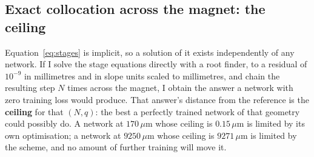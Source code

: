 \documentclass[11pt,a4paper]{article}
\newcommand{\um}{\ensuremath{\,\mu\mathrm{m}}}
\begin{document}
\subsection{Exact collocation across the magnet: the ceiling}
\label{sec:scheme-ceiling}

Equation~\eqref{eq:stages} is implicit, so a solution of it exists independently of
any network. If I solve the stage equations directly with a root finder, to a
residual of $10^{-9}$ in millimetres and in slope units scaled to millimetres,
and chain the resulting step $N$ times across the magnet, I obtain the answer a
network with zero training loss would produce. That answer's distance from the
reference is the \textbf{ceiling} for that $(N, q)$: the best a perfectly trained
network of that geometry could possibly do. A network at $170\um$ whose ceiling
is $0.15\um$ is limited by its own optimisation; a network at $9250\um$ whose
ceiling is $9271\um$ is limited by the scheme, and no amount of further training
will move it.
\end{document}
